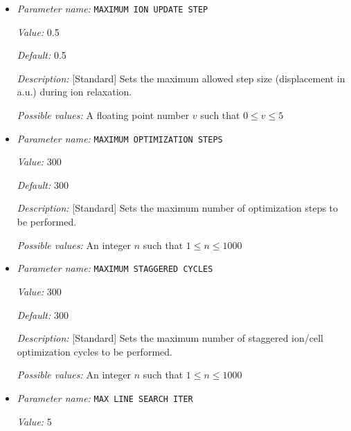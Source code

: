 \begin{itemize}
{\it Possible values:} A floating point number $v$ such that $0 \leq v \leq 5$
\item {\it Parameter name:} {\tt MAXIMUM ION UPDATE STEP}
\label{parameters:Geometry/Optimization/MAXIMUM ION UPDATE STEP}
\label{parameters:Geometry/Optimization/MAXIMUM_20ION_20UPDATE_20STEP}


{\it Value:} 0.5


{\it Default:} 0.5


{\it Description:} [Standard] Sets the maximum allowed step size (displacement in a.u.) during ion relaxation.


{\it Possible values:} A floating point number $v$ such that $0 \leq v \leq 5$
\item {\it Parameter name:} {\tt MAXIMUM OPTIMIZATION STEPS}
\label{parameters:Geometry/Optimization/MAXIMUM OPTIMIZATION STEPS}
\label{parameters:Geometry/Optimization/MAXIMUM_20OPTIMIZATION_20STEPS}


{\it Value:} 300


{\it Default:} 300


{\it Description:} [Standard] Sets the maximum number of optimization steps to be performed.


{\it Possible values:} An integer $n$ such that $1\leq n \leq 1000$
\item {\it Parameter name:} {\tt MAXIMUM STAGGERED CYCLES}
\label{parameters:Geometry/Optimization/MAXIMUM STAGGERED CYCLES}
\label{parameters:Geometry/Optimization/MAXIMUM_20STAGGERED_20CYCLES}


{\it Value:} 300


{\it Default:} 300


{\it Description:} [Standard] Sets the maximum number of staggered ion/cell optimization cycles to be performed.


{\it Possible values:} An integer $n$ such that $1\leq n \leq 1000$
\item {\it Parameter name:} {\tt MAX LINE SEARCH ITER}
\label{parameters:Geometry/Optimization/MAX LINE SEARCH ITER}
\label{parameters:Geometry/Optimization/MAX_20LINE_20SEARCH_20ITER}


{\it Value:} 5



\end{itemize}
